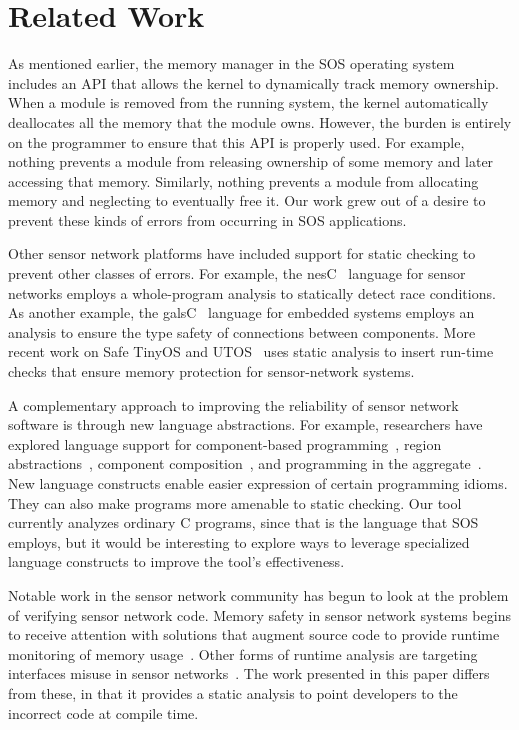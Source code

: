 \section{Related Work}
\label{sec:related}


As mentioned earlier, the memory manager in the SOS operating
system~\cite{sos} includes an API that allows the kernel
to dynamically track memory ownership.  When a module is removed from the
running system, the kernel automatically deallocates all the memory that the
module owns.  However, the burden is entirely on the programmer to
ensure that this API is properly used.  For
example, nothing prevents a
module from releasing ownership of some memory and later accessing
that memory.  
Similarly, nothing prevents a module from allocating memory
and neglecting to eventually free it.  
Our work grew out of a desire to
prevent these kinds of errors from occurring in SOS applications.


Other sensor network platforms have included support for static
checking to prevent other classes of errors.  For example, the
nesC~\cite{nesC} language for sensor networks employs a whole-program
analysis to statically detect race conditions.  As another example,
the galsC~\cite{TinyGALS,galsC} language for embedded systems employs
an analysis to ensure the type safety of connections between
components.  More recent work on Safe TinyOS and
UTOS~\cite{regehr06memory} uses static analysis to insert run-time
checks that ensure memory protection for sensor-network systems.

A complementary approach to improving the reliability of sensor
network software is through new language abstractions.  For example,
researchers have explored language support for component-based
programming~\cite{TinyOS,nesC,galsC}, region
abstractions~\cite{conf/mobisys/WhitehouseSCB04,conf/nsdi/WelshM04},
component composition~\cite{conf/sensys/GreensteinKE04}, and
programming in the aggregate~\cite{1052213,conf/dcoss/GummadiGG05}.
New language constructs enable easier expression of certain
programming idioms.  They can also make programs more amenable to
static checking.  Our tool currently analyzes ordinary C programs,
since that is the language that SOS employs, but it would be
interesting to explore ways to leverage specialized language
constructs to improve the tool's effectiveness.

Notable work in the sensor network community has begun to look at the problem
of verifying sensor network code.  Memory safety in sensor network systems
begins to receive attention with solutions that augment source code to provide
runtime monitoring of memory usage~\cite{regehr06memory,kumar07memory}.
Other forms of runtime analysis are targeting interfaces misuse in sensor
networks~\cite{regehr07memory}.  The work presented in this paper differs from
these, in that it provides a static analysis to point developers to the
incorrect code at compile time.

